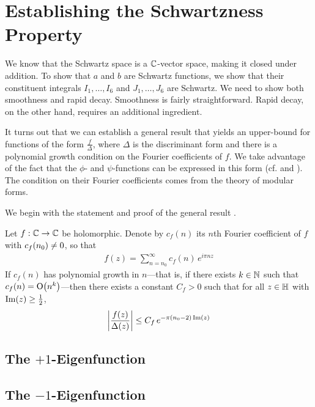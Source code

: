 \section{Establishing the Schwartzness Property}

We know that the Schwartz space is a $\mathbb{C}$-vector space, making it closed under addition. To show that $a$ and $b$ are Schwartz functions, we show that their constituent integrals $I_1, \ldots, I_6$ and $J_1, \ldots, J_6$ are Schwartz. We need to show both smoothness and rapid decay. Smoothness is fairly straightforward. Rapid decay, on the other hand, requires an additional ingredient.

It turns out that we can establish a general result that yields an upper-bound for functions of the form $\frac{f}{\Delta}$, where $\Delta$ is the discriminant form and there is a polynomial growth condition on the Fourier coefficients of $f$. We take advantage of the fact that the $\phi$- and $\psi$-functions can be expressed in this form (cf.  and ). The condition on their Fourier coefficients comes from the theory of modular forms.

We begin with the statement and proof of the general result \cite[Lemma 7.4]{blueprint}.

\begin{boxtheorem}\label{SP:PolyFourierCoeffBound}
    Let $f : \mathbb{C} \to \mathbb{C}$ be holomorphic. Denote by $c_f(n)$ its $n$th Fourier coefficient of $f$ with $c_f\!\left( n_0 \right) \neq 0$, so that
    \begin{align*}
        f(z) = \sum_{n=n_0}^{\infty} c_f(n) \, e^{i \pi n z}
    \end{align*}
    If $c_f(n)$ has polynomial growth in $n$---that is, if there exists $k \in \mathbb{N}$ such that $c_f(n) = \operatorname{O}\!\left( n^k \right)$---then there exists a constant $C_f > 0$ such that for all $z \in \mathbb{H}$ with $\operatorname{Im}\!\left( z \right) \geq \frac{1}{2}$,
    \begin{align*}
        \left\lvert \frac{f(z)}{\Delta(z)} \right\rvert \leq C_f \, e^{-\pi \left( n_0 - 2 \right) \operatorname{Im}(z)}
    \end{align*}
\end{boxtheorem}


\subsection{The $+1$-Eigenfunction}

\subsection{The $-1$-Eigenfunction}